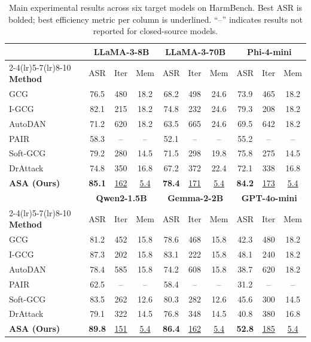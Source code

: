 \documentclass[preprint,12pt]{elsarticle}
\begin{document}
\begin{table}[t]
\centering
\caption{Main experimental results across six target models on HarmBench. Best ASR is bolded; best efficiency metric per column is underlined. ``--'' indicates results not reported for closed-source models.}
\label{tab:main_results}
\begin{tabular}{l ccc ccc ccc}
\toprule
& \multicolumn{3}{c}{\textbf{LLaMA-3-8B}} & \multicolumn{3}{c}{\textbf{LLaMA-3-70B}} & \multicolumn{3}{c}{\textbf{Phi-4-mini}} \\
\cmidrule(lr){2-4}\cmidrule(lr){5-7}\cmidrule(lr){8-10}
\textbf{Method} & ASR & Iter & Mem & ASR & Iter & Mem & ASR & Iter & Mem \\
\midrule
GCG & 76.5 & 480 & 18.2 & 68.2 & 498 & 24.6 & 73.9 & 465 & 18.2 \\
I-GCG & 82.1 & 215 & 18.2 & 74.8 & 232 & 24.6 & 79.3 & 208 & 18.2 \\
AutoDAN & 71.2 & 620 & 18.2 & 63.5 & 665 & 24.6 & 69.5 & 642 & 18.2 \\
PAIR & 58.3 & -- & -- & 52.1 & -- & -- & 55.2 & -- & -- \\
Soft-GCG & 79.2 & 280 & 14.5 & 71.5 & 298 & 19.8 & 75.8 & 275 & 14.5 \\
DrAttack & 74.8 & 350 & 16.8 & 67.2 & 372 & 22.4 & 72.1 & 338 & 16.8 \\
\rowcolor[gray]{0.9}
\textbf{ASA (Ours)} & \textbf{85.1} & \underline{162} & \underline{5.4} & \textbf{78.4} & \underline{171} & \underline{5.4} & \textbf{84.2} & \underline{173} & \underline{5.4} \\
\bottomrule

& \multicolumn{3}{c}{\textbf{Qwen2-1.5B}} & \multicolumn{3}{c}{\textbf{Gemma-2-2B}} & \multicolumn{3}{c}{\textbf{GPT-4o-mini}} \\
\cmidrule(lr){2-4}\cmidrule(lr){5-7}\cmidrule(lr){8-10}
\textbf{Method} & ASR & Iter & Mem & ASR & Iter & Mem & ASR & Iter & Mem \\
\midrule
GCG & 81.2 & 452 & 15.8 & 78.6 & 468 & 15.8 & 42.3 & 480 & 18.2 \\
I-GCG & 87.3 & 202 & 15.8 & 83.1 & 222 & 15.8 & 48.1 & 240 & 18.2 \\
AutoDAN & 78.4 & 585 & 15.8 & 74.2 & 608 & 15.8 & 38.7 & 620 & 18.2 \\
PAIR & 62.5 & -- & -- & 58.4 & -- & -- & 31.2 & -- & -- \\
Soft-GCG & 83.5 & 262 & 12.6 & 80.3 & 282 & 12.6 & 45.6 & 300 & 14.5 \\
DrAttack & 79.1 & 322 & 14.5 & 76.8 & 348 & 14.5 & 40.8 & 380 & 16.8 \\
\rowcolor[gray]{0.9}
\textbf{ASA (Ours)} & \textbf{89.8} & \underline{151} & \underline{5.4} & \textbf{86.4} & \underline{162} & \underline{5.4} & \textbf{52.8} & \underline{185} & \underline{5.4} \\
\bottomrule
\end{tabular}
\end{table}
\end{document}
